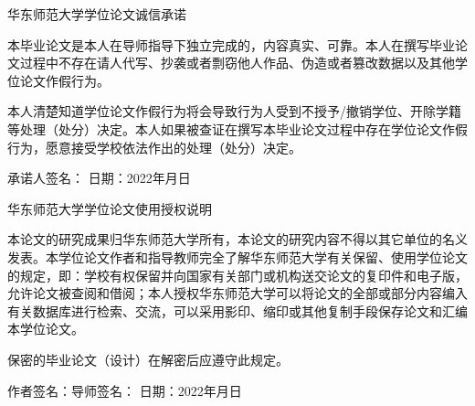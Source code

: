 \clearpage                                          %
\thispagestyle{empty}                               %

\vspace{10mm}
\begin{center}
{\Large\textbf\heiti{} 华东师范大学学位论文诚信承诺}   %
\end{center}



本毕业论文是本人在导师指导下独立完成的，内容真实、可靠。本人在撰写毕业论文过程中不存在请人代写、抄袭或者剽窃他人作品、伪造或者篡改数据以及其他学位论文作假行为。

本人清楚知道学位论文作假行为将会导致行为人受到不授予/撤销学位、开除学籍等处理（处分）决定。本人如果被查证在撰写本毕业论文过程中存在学位论文作假行为，愿意接受学校依法作出的处理（处分）决定。

\vspace{5mm}
承诺人签名： \hfill { 日期：2022年\quad 月\quad 日}


\vspace{30mm}
\begin{center}
{\Large\textbf\heiti{} 华东师范大学学位论文使用授权说明}   %
\end{center}

本论文的研究成果归华东师范大学所有，本论文的研究内容不得以其它单位的名义发表。本学位论文作者和指导教师完全了解华东师范大学有关保留、使用学位论文的规定，即：学校有权保留并向国家有关部门或机构送交论文的复印件和电子版，允许论文被查阅和借阅；本人授权华东师范大学可以将论文的全部或部分内容编入有关数据库进行检索、交流，可以采用影印、缩印或其他复制手段保存论文和汇编本学位论文。

保密的毕业论文（设计）在解密后应遵守此规定。

\vspace{5mm}
作者签名：\qquad\qquad\qquad\qquad\quad             导师签名：          \hfill { 日期：2022年\quad 月\quad 日}


\newpage
